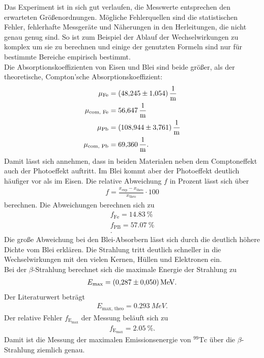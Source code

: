 Das Experiment ist in sich gut verlaufen, die Messwerte entsprechen den erwarteten Größenordnungen.
Mögliche Fehlerquellen sind die statistischen Fehler, fehlerhafte Messgeräte und Näherungen in den Herleitungen, die nicht genau genug sind.
So ist zum Beispiel der Ablauf der Wechselwirkungen zu komplex um sie zu berechnen und einige der genutzten Formeln sind nur für bestimmte Bereiche empirisch bestimmt.
\\Die Absorptionskoeffizienten von Eisen und Blei sind beide größer, als der theoretische, Compton'sche Absorptionskoeffizient:
\begin{align*}
  \mu_{\text{Fe}} &= \SI{48.245 \pm 1.054}{\frac{1}{m}}\\
  \mu_{\text{com, Fe}} &= \SI{56.647}{\frac{1}{m}}\\
  \mu_{\text{Pb}} &= \SI{108.944 \pm 3.761}{\frac{1}{m}}\\
  \mu_{\text{com, Pb}}&= \SI{69.360}{\frac{1}{m}}.\\
\end{align*}
Damit lässt sich annehmen, dass in beiden Materialen neben dem Comptoneffekt auch der Photoeffekt auftritt.
Im Blei kommt aber der Photoeffekt deutlich häufiger vor als im Eisen.
Die relative Abweichung $f$ in Prozent lässt sich über
\begin{align*}
  f= \frac{x_{\text{exp}}-x_{\text{theo}}}{x_{\text{theo}}}\cdot 100
\end{align*}
berechnen.
Die Abweichungen berechnen sich zu
\begin{align*}
  f_{\text{Fe}}=\SI{14.83}{\%}\\
  f_{\text{PB}}=\SI{57.07}{\%}\\.
\end{align*}
Die große Abweichung bei den Blei-Absorbern lässt sich durch die deutlich höhere Dichte vom Blei erklären.
Die Strahlung tritt deutlich schneller in die Wechselwirkungen mit den vielen Kernen, Hüllen und Elektronen ein.
\\Bei der $\beta$-Strahlung berechnet sich die maximale Energie der Strahlung zu
\begin{align*}
  E_{\text{max}}= \SI{0.287 \pm 0.050}{MeV}.
\end{align*}
Der Literaturwert \cite{tc2} beträgt
\begin{align*}
  E_{\text{max, theo}}= \SI{0.293}{MeV}.
\end{align*}
Der relative Fehler $f_{\text{E}_{\text{max}}}$ der Messung beläuft sich zu
\begin{align*}
  f_{\text{E}_{\text{max}}}=\SI{2.05}{\%}.
\end{align*}
Damit ist die Messung der maximalen Emissionsenergie von $^{99}\text{Tc}$ über die $\beta$-Strahlung ziemlich genau.
